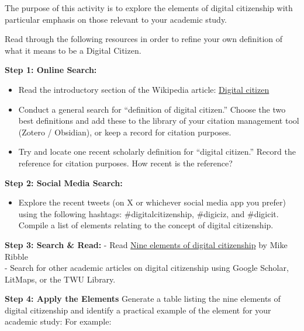 \documentclass[
]{book}
\providecommand{\tightlist}{%
  \setlength{\itemsep}{0pt}\setlength{\parskip}{0pt}}
\theoremstyle{definition}
\theoremstyle{definition}
\theoremstyle{definition}
\theoremstyle{definition}
\theoremstyle{remark}
\begin{document}
\begin{reflect}
The purpose of this activity is to explore the elements of digital citizenship with particular emphasis on those relevant to your academic study.

Read through the following resources in order to refine your own definition of what it means to be a Digital Citizen.

\textbf{Step 1: Online Search:}

\begin{itemize}
\tightlist
\item
  Read the introductory section of the Wikipedia article: \href{https://en.wikipedia.org/wiki/Digital_citizen}{Digital citizen}\\
\item
  Conduct a general search for ``definition of digital citizen.'' Choose the two best definitions and add these to the library of your citation management tool (Zotero / Obsidian), or keep a record for citation purposes.\\
\item
  Try and locate one recent scholarly definition for ``digital citizen.'' Record the reference for citation purposes. How recent is the reference?
\end{itemize}

\textbf{Step 2: Social Media Search:}

\begin{itemize}
\tightlist
\item
  Explore the recent tweets (on X or whichever social media app you prefer) using the following hashtags: \#digitalcitizenship, \#digiciz, and \#digicit. Compile a list of elements relating to the concept of digital citizenship.
\end{itemize}

\textbf{Step 3: Search \& Read:}
- Read \href{https://www.digitalcitizenship.net/nine-elements.html}{Nine elements of digital citizenship} by Mike Ribble\\
- Search for other academic articles on digital citizenship using Google Scholar, LitMaps, or the TWU Library.

\textbf{Step 4: Apply the Elements}
Generate a table listing the nine elements of digital citizenship and identify a practical example of the element for your academic study: For example:


\end{reflect}
\end{document}
